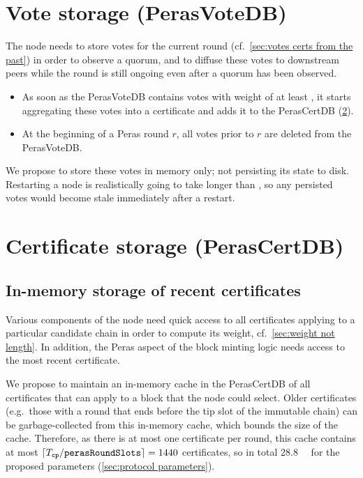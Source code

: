 \section{Vote storage (PerasVoteDB)}\label{sec:vote db}

The node needs to store votes for the current round (cf.~\cref{sec:votes certs from the past}) in order to observe a quorum, and to diffuse these votes to downstream peers while the round is still ongoing even after a quorum has been observed.

\begin{itemize}
\item
  As soon as the PerasVoteDB contains votes with weight of at least \perasQuorum, it starts aggregating these votes into a certificate and adds it to the PerasCertDB (\cref{sec:cert db}).
\item
  At the beginning of a Peras round $r$, all votes prior to $r$ are deleted from the PerasVoteDB\@.
\end{itemize}

We propose to store these votes in memory only; not persisting its state to disk.
Restarting a node is realistically going to take longer than \perasRoundSlots{}, so any persisted votes would become stale immediately after a restart.

\section{Certificate storage (PerasCertDB)}\label{sec:cert db}

\subsection{In-memory storage of recent certificates}
Various components of the node need quick access to all certificates applying to a particular candidate chain in order to compute its weight, cf.~\cref{sec:weight not length}.
In addition, the Peras aspect of the block minting logic needs access to the most recent certificate.

We propose to maintain an in-memory cache in the PerasCertDB of all certificates that can apply to a block that the node could select.
Older certificates (e.g.\ those with a round that ends before the tip slot of the immutable chain) can be garbage-collected from this in-memory cache, which bounds the size of the cache.
Therefore, as there is at most one certificate per round, this cache contains at most $\lceil T_{\mathtt{cp}} / \mathtt{perasRoundSlots} \rceil = 1440$ certificates, so in total \qty{28.8}{\mega\byte} for the proposed parameters (\cref{sec:protocol parameters}).

